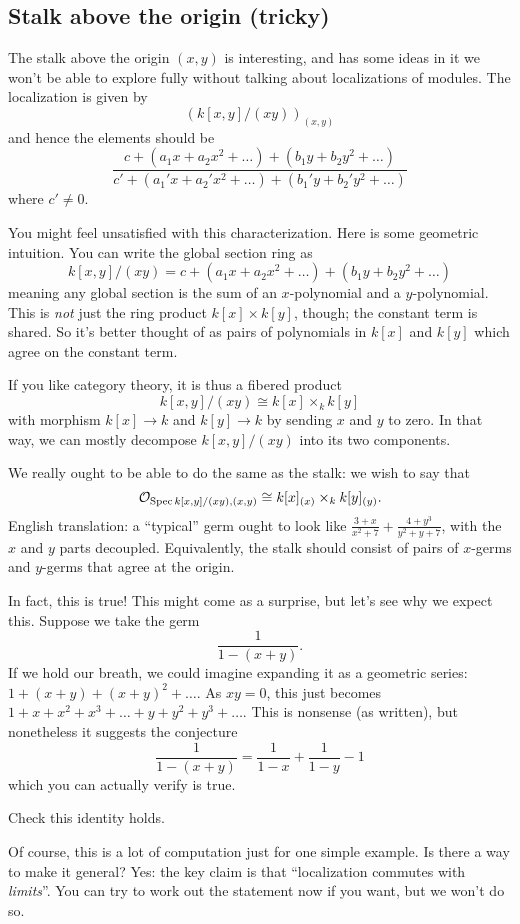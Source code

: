 \subsection{Stalk above the origin (tricky)}
The stalk above the origin $(x,y)$ is interesting,
and has some ideas in it we won't be able to explore fully
without talking about localizations of modules.
The localization is given by
\[ (k[x,y] / (xy))_{(x,y)} \]
and hence the elements should be
\[ \frac{c + (a_1 x + a_2 x^2 + \dots)
	+ (b_1 y + b_2 y^2 + \dots)}
	{c' + (a_1' x + a_2' x^2 + \dots)
	+ (b_1' y + b_2' y^2 + \dots)}
\]
where $c' \neq 0$.

You might feel unsatisfied with this characterization.
Here is some geometric intuition.
You can write the global section ring as
\[ k[x,y] / (xy) = c + (a_1 x + a_2 x^2 + \dots)
	+ (b_1 y + b_2 y^2 + \dots) \]
meaning any global section is the sum of an $x$-polynomial
and a $y$-polynomial.
This is \emph{not} just the ring product $k[x] \times k[y]$, though;
the constant term is shared.
So it's better thought of as pairs of polynomials in $k[x]$
and $k[y]$ which agree on the constant term.

If you like category theory, it is thus a fibered product
\[ k[x,y] / (xy) \cong k[x] \times_k k[y] \]
with morphism $k[x] \to k$ and $k[y] \to k$ by sending $x$ and $y$ to zero.
In that way, we can mostly decompose $k[x,y] / (xy)$
into its two components.

We really ought to be able to do the same as the stalk:
we wish to say that
\[ \mathcal O_{\operatorname{Spec} k[x,y] / (xy), (x,y)}
	\cong k[x]_{(x)} \times_k k[y]_{(y)}. \]
English translation: a ``typical'' germ
ought to look like $\frac{3+x}{x^2+7} + \frac{4+y^3}{y^2+y+7}$,
with the $x$ and $y$ parts decoupled.
Equivalently, the stalk should consist of
pairs of $x$-germs and $y$-germs that agree at the origin.

In fact, this is true!
This might come as a surprise, but let's see why we expect this.
Suppose we take the germ
\[ \frac{1}{1-(x+y)}. \]
If we hold our breath, we could imagine expanding it as
a geometric series: $1 + (x+y) + (x+y)^2 + \dots$.
As $xy =0 $, this just becomes $1+x+x^2+x^3 + \dots + y+y^2+y^3+\dots$.
This is nonsense (as written), but nonetheless it suggests the conjecture
\[ \frac{1}{1-(x+y)} = \frac{1}{1-x} + \frac{1}{1-y} - 1 \]
which you can actually verify is true.
\begin{ques}
	Check this identity holds.
\end{ques}

Of course, this is a lot of computation just for one simple example.
Is there a way to make it general?
Yes: the key claim is that ``localization commutes with \emph{limits}''.
You can try to work out the statement now if you want, but we won't do so.

